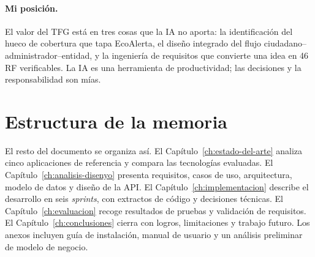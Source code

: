 \paragraph{Mi posición.}  El valor del TFG está en tres cosas que la IA no aporta: la identificación del hueco de cobertura que tapa EcoAlerta, el diseño integrado del flujo ciudadano--administrador--entidad, y la ingeniería de requisitos que convierte una idea en 46 RF verificables. La IA es una herramienta de productividad; las decisiones y la responsabilidad son mías.


\section{Estructura de la memoria}
\label{sec:estructura-memoria}

El resto del documento se organiza así. El Capítulo~\ref{ch:estado-del-arte} analiza cinco aplicaciones de referencia y compara las tecnologías evaluadas. El Capítulo~\ref{ch:analisis-disenyo} presenta requisitos, casos de uso, arquitectura, modelo de datos y diseño de la API. El Capítulo~\ref{ch:implementacion} describe el desarrollo en seis \textit{sprints}, con extractos de código y decisiones técnicas. El Capítulo~\ref{ch:evaluacion} recoge resultados de pruebas y validación de requisitos. El Capítulo~\ref{ch:conclusiones} cierra con logros, limitaciones y trabajo futuro. Los anexos incluyen guía de instalación, manual de usuario y un análisis preliminar de modelo de negocio.
